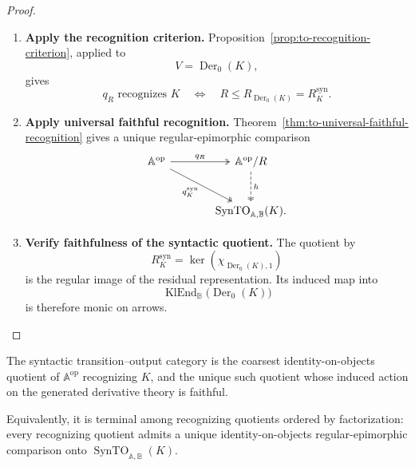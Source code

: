\begin{proof}
    \leavevmode
    \begin{enumerate}
        \item \textbf{Apply the recognition criterion.}
        Proposition~\ref{prop:to-recognition-criterion}, applied to
        \[
            V=\operatorname{Der}_0(K),
        \]
        gives
        \[
            q_R\text{ recognizes }K
            \quad\Longleftrightarrow\quad
            R\leq R_{\operatorname{Der}_0(K)}
            =
            R_K^{\mathrm{syn}}.
        \]

        \item \textbf{Apply universal faithful recognition.}
        Theorem~\ref{thm:to-universal-faithful-recognition} gives a unique
        regular-epimorphic comparison
        \[
        \begin{tikzcd}[column sep=large, row sep=large]
            \mathbb A^{\mathrm{op}}
                \arrow[r, two heads, "q_R"]
                \arrow[dr, two heads,
                "q_K^{\mathrm{syn}}"']
            &
            \mathbb A^{\mathrm{op}}/R
                \arrow[d, dashed, two heads, "h"]
            \\
            &
            \operatorname{SynTO}_{\mathbb A,\mathbb B}(K).
        \end{tikzcd}
        \]

        \item \textbf{Verify faithfulness of the syntactic quotient.}
        The quotient by
        \[
            R_K^{\mathrm{syn}}
            =
            \ker
            \left(
                \chi_{\operatorname{Der}_0(K),1}
            \right)
        \]
        is the regular image of the residual representation. Its induced map
        into
        \[
            \operatorname{KlEnd}_{\mathbb B}
            \bigl(\operatorname{Der}_0(K)\bigr)
        \]
        is therefore monic on arrows.
    \end{enumerate}
\end{proof}

\begin{corollary}
\label{cor:to-coarsest-recognizing-quotient}
    The syntactic transition--output category is the coarsest
    identity-on-objects quotient of \(\mathbb A^{\mathrm{op}}\) recognizing
    \(K\), and the unique such quotient whose induced action on the generated
    derivative theory is faithful.

    Equivalently, it is terminal among recognizing quotients ordered by
    factorization: every recognizing quotient admits a unique
    identity-on-objects regular-epimorphic comparison onto
    \(\operatorname{SynTO}_{\mathbb A,\mathbb B}(K)\).
\end{corollary}

